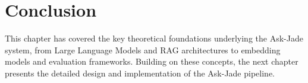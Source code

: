 \section{Conclusion}
This chapter has covered the key theoretical foundations underlying the
Ask-Jade system, from Large Language Models and RAG architectures to
embedding models and evaluation frameworks. Building on these concepts,
the next chapter presents the detailed design and implementation of the
Ask-Jade pipeline.